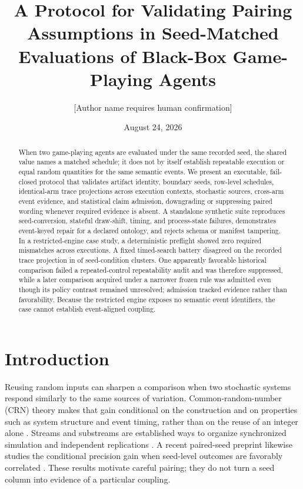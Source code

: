 \documentclass[aps,reprint,superscriptaddress,longbibliography,floatfix]{revtex4-2}
\begin{document}
\title{A Protocol for Validating Pairing Assumptions in Seed-Matched Evaluations of Black-Box Game-Playing Agents}

\author{[Author name requires human confirmation]}
\date{August 24, 2026}

\begin{abstract}
When two game-playing agents are evaluated under the same recorded seed, the
shared value names a matched schedule; it does not by itself establish
repeatable execution or equal random quantities for the same semantic events.
We present an executable, fail-closed protocol that validates artifact
identity, boundary seeds, row-level schedules, identical-arm trace projections
across execution contexts, stochastic sources, cross-arm event evidence, and
statistical claim admission, downgrading or suppressing paired wording whenever
required evidence is absent.  A standalone synthetic suite reproduces
seed-conversion, stateful draw-shift, timing, and process-state failures,
demonstrates event-keyed repair for a declared ontology, and rejects schema or
manifest tampering.  In a restricted-engine case study, a deterministic
preflight showed zero required mismatches across \PreflightExecutions{}
executions.  A fixed timed-search battery disagreed on the recorded trace
projection in \StressTraceMismatch{} of \StressClusters{} seed-condition
clusters.  One apparently favorable historical comparison failed a
repeated-control repeatability audit and was therefore suppressed, while a
later comparison acquired under a narrower frozen rule was admitted even
though its policy contrast remained unresolved; admission tracked evidence
rather than favorability.
Because the restricted engine exposes no semantic event identifiers, the case
cannot establish event-aligned coupling.
\end{abstract}

\maketitle

\section{Introduction}

Reusing random inputs can sharpen a comparison when two stochastic systems
respond similarly to the same sources of variation.  Common-random-number
(CRN) theory makes that gain conditional on the construction and on properties
such as system structure and event timing, rather than on the reuse of an
integer alone \cite{glasserman1992crn}.  Streams and substreams are established
ways to organize synchronized simulation and independent replications
\cite{lecuyer2002streams}.  A recent paired-seed preprint likewise studies the
conditional precision gain when seed-level outcomes are favorably correlated
\cite{sharma2025pairedseeds}.  These results motivate careful pairing; they do
not turn a seed column into evidence of a particular coupling.
\end{document}
